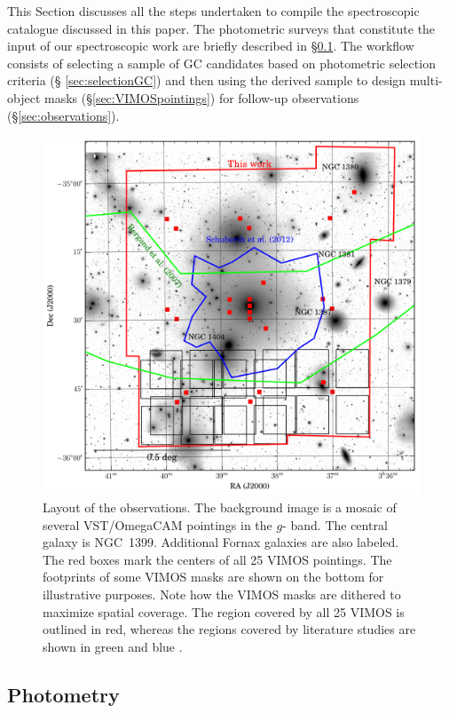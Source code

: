 \documentclass[usenatbib]{mnras}
\begin{document}
This Section discusses all the steps undertaken to compile the spectroscopic
catalogue discussed in this paper. The photometric surveys that constitute the input
of our spectroscopic work are briefly described in \S\ref{sec:phot}. The
workflow consists of selecting a sample of GC candidates based on photometric
selection criteria (\S
\ref{sec:selectionGC}) and then using the derived sample to design multi-object
masks (\S \ref{sec:VIMOSpointings}) for follow-up
observations (\S \ref{sec:observations}).

\begin{figure}
\centering
\includegraphics[scale=0.7]{figures/fov.png}
\caption{Layout of the observations. The background image is a mosaic of
several VST/OmegaCAM pointings in the $g$-
band. The central galaxy is NGC~1399. Additional Fornax galaxies are also
labeled. The red boxes mark the centers of all
25 VIMOS pointings. The footprints of some VIMOS masks are shown on the bottom
for illustrative purposes. Note how
the VIMOS masks are dithered to maximize spatial coverage. The region
covered by all 25 VIMOS is outlined in red,
whereas the regions covered by literature studies are shown in green
\citep{Bergond07} and blue \citep{Schuberth}.}
\label{fig:fov}
\end{figure}

\subsection{Photometry}
\label{sec:phot}
\end{document}
